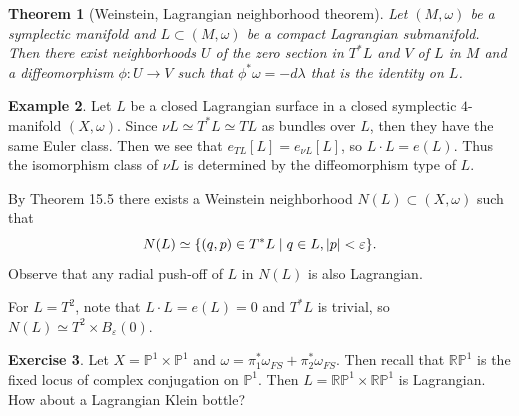 \documentclass[leqno, openany]{memoir}
\DeclarePairedDelimiter{\abs}{\lvert}{\rvert}
\newtheorem{thm}{Theorem}[chapter]
\theoremstyle{definition}
\newtheorem{exm}[thm]{Example}
\newtheorem{exer}[thm]{Exercise}
\theoremstyle{remark}
\theoremstyle{plain}
\theoremstyle{definition}
\theoremstyle{remark}
\newcommand{\R}{\mathbb{R}}
\renewcommand{\P}{\mathbb{P}}
\newcommand{\ep}{\varepsilon}
\begin{document}
    \begin{thm}[Weinstein, Lagrangian neighborhood theorem]
        Let $(M, \omega)$ be a symplectic manifold and $L \subset (M, \omega)$ be a compact Lagrangian submanifold. Then there exist neighborhoods $U$ of the zero section in $T^*L$ and $V$ of $L$ in $M$ and a diffeomorphism $\phi: U \to V$ such that $\phi^* \omega = - d \lambda$ that is the identity on $L$.
    \end{thm}

    \begin{exm}
        Let $L$ be a closed Lagrangian surface in a closed symplectic $4$-manifold $(X, \omega)$. Since $\nu L \simeq T^*L \simeq TL$ as bundles over $L$, then they have the same Euler class. Then we see that $e_{TL}[L] = e_{\nu L}[L]$, so $L \cdot L = e(L)$. Thus the isomorphism class of $\nu L$ is determined by the diffeomorphism type of $L$.

    By Theorem 15.5 there exists a Weinstein neighborhood $N(L) \subset (X, \omega)$ such that 
    \[N(L) \simeq \{ (q,p) \in T^* L \mid q \in L, \abs{p} < \ep \}. \]
    Observe that any radial push-off of $L$ in $N(L)$ is also Lagrangian.

    For $L = T^2$, note that $L \cdot L = e(L) = 0$ and $T^*L$ is trivial, so $N(L) \simeq T^2 \times B_{\ep}(0)$.
    \end{exm}

    \begin{exer}
        Let $X = \P^1 \times \P^1$ and $\omega = \pi_1^* \omega_{FS} + \pi_2^* \omega_{FS}$. Then recall that $\R\P^1$ is the fixed locus of complex conjugation on $\P^1$. Then $L = \R\P^1 \times \R\P^1$ is Lagrangian. How about a Lagrangian Klein bottle?
    \end{exer}
    
    
\end{document}
